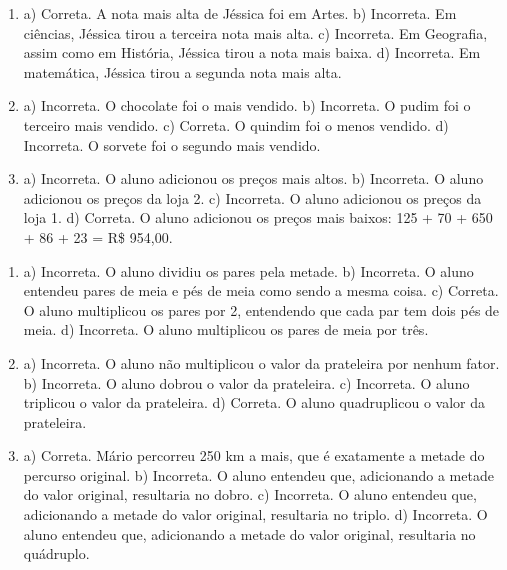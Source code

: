 
\begin{enumerate}
\item
a) Correta. A nota mais alta de Jéssica foi em Artes.
b) Incorreta. Em ciências, Jéssica tirou a terceira nota mais alta.
c) Incorreta. Em Geografia, assim como em História, Jéssica tirou a nota mais baixa.
d) Incorreta. Em matemática, Jéssica tirou a segunda nota mais alta.

\item
a) Incorreta. O chocolate foi o mais vendido.
b) Incorreta. O pudim foi o terceiro mais vendido.
c) Correta. O quindim foi o menos vendido.
d) Incorreta. O sorvete foi o segundo mais vendido.

\item
a) Incorreta. O aluno adicionou os preços mais altos.
b) Incorreta. O aluno adicionou os preços da loja 2.
c) Incorreta. O aluno adicionou os preços da loja 1.
d) Correta. O aluno adicionou os preços mais baixos: 125 + 70 + 650 + 86 + 23 = R\$ 954,00.
\end{enumerate}


\begin{enumerate}
\item
a) Incorreta. O aluno dividiu os pares pela metade.
b) Incorreta. O aluno entendeu pares de meia e pés de meia como sendo a
mesma coisa.
c) Correta. O aluno multiplicou os pares por 2, entendendo que cada par
tem dois pés de meia.
d) Incorreta. O aluno multiplicou os pares de meia por três.

\item
a) Incorreta. O aluno não multiplicou o valor da prateleira por nenhum fator.
b) Incorreta. O aluno dobrou o valor da prateleira.
c) Incorreta. O aluno triplicou o valor da prateleira.
d) Correta. O aluno quadruplicou o valor da prateleira.

\item
a) Correta. Mário percorreu 250 km a mais, que é exatamente a metade do percurso original.
b) Incorreta. O aluno entendeu que, adicionando a metade do valor original, resultaria no dobro.
c) Incorreta. O aluno entendeu que, adicionando a metade do valor original, resultaria no triplo.
d) Incorreta. O aluno entendeu que, adicionando a metade do valor original, resultaria no quádruplo.
\end{enumerate}


